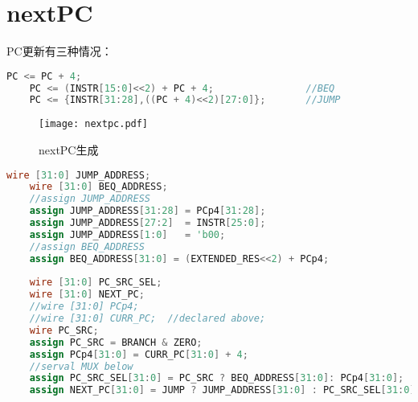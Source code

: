 \documentclass[a4paper]{article}
\begin{document}
\section{nextPC}
    PC更新有三种情况：
    \begin{lstlisting}[language={Verilog}]
    PC <= PC + 4;
    PC <= (INSTR[15:0]<<2) + PC + 4;                //BEQ
    PC <= {INSTR[31:28],((PC + 4)<<2)[27:0]};       //JUMP    \end{lstlisting}
\begin{figure}
  \centering
  \texttt{[image: nextpc.pdf]}
  \caption{nextPC生成}
\end{figure}
\begin{lstlisting}[language={Verilog},title={nextPC.v}]
	wire [31:0] JUMP_ADDRESS;
	wire [31:0] BEQ_ADDRESS;
	//assign JUMP_ADDRESS
	assign JUMP_ADDRESS[31:28] = PCp4[31:28];
	assign JUMP_ADDRESS[27:2]  = INSTR[25:0];
	assign JUMP_ADDRESS[1:0]   = 'b00;
	//assign BEQ_ADDRESS
	assign BEQ_ADDRESS[31:0] = (EXTENDED_RES<<2) + PCp4;	
	
	wire [31:0] PC_SRC_SEL;
    wire [31:0] NEXT_PC;
	//wire [31:0] PCp4;
	//wire [31:0] CURR_PC;  //declared above;
	wire PC_SRC;
	assign PC_SRC = BRANCH & ZERO;	
	assign PCp4[31:0] = CURR_PC[31:0] + 4;
	//serval MUX below
	assign PC_SRC_SEL[31:0] = PC_SRC ? BEQ_ADDRESS[31:0]: PCp4[31:0];
	assign NEXT_PC[31:0] = JUMP ? JUMP_ADDRESS[31:0] : PC_SRC_SEL[31:0];   \end{lstlisting}
\end{document}

